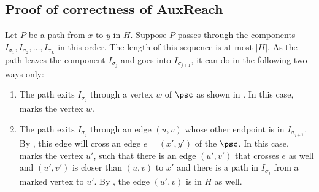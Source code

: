 \documentclass{toc}
\begin{document}
\subsection{Proof of correctness of \textsf{AuxReach}}

Let $P$ be a path from $x$ to $y$ in $H$. Suppose $P$ passes through the components $I_{\sigma_1}, I_{\sigma_2}, \ldots, I_{\sigma_L}$ in this order. The length of this sequence %
is %
 at most $\lvert H \rvert$. As the path leaves the component $I_{\sigma_j}$ and goes into $I_{\sigma_{j+1}}$, it can do in the following two ways only:
\begin{enumerate}
\item The path exits $I_{\sigma_j}$ through a vertex $w$ of $\psc$ as shown in . In this case,  %
marks  %
the vertex $w$.
\item The path exits $I_{\sigma_j}$ through an edge $(u, v)$ whose other endpoint is in $I_{\sigma_{j+1}}$. By , this edge will cross an edge $e = (x',y')$ of the $\psc$. In this case,  %
marks  %
the vertex $u'$, such that there is an edge $(u', v')$ that crosses $e$ as well and $(u',v')$ is closer than $(u,v)$ to $x'$ and there is a path in $I_{\sigma_j}$ from a marked vertex to $u'$. By , the edge $(u', v)$ %
is  %
%
 in $H$ as well.
\end{enumerate}
\end{document}
